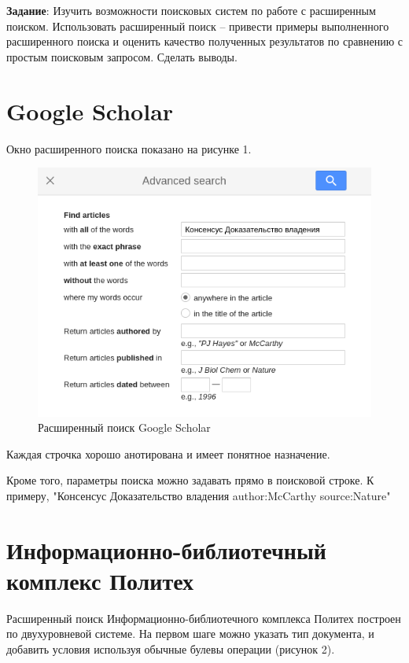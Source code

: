 \documentclass[a4paper, 12pt]{report}		%
\begin{document}
\textbf{Задание}: Изучить возможности поисковых систем по работе с расширенным поиском. Использовать расширенный поиск – привести примеры выполненного расширенного поиска и оценить качество полученных результатов по сравнению с простым поисковым запросом. Сделать выводы.

\section*{Google Scholar}

Окно расширенного поиска показано на рисунке 1.

\begin{figure}[H]
 \centering
 \includegraphics[scale=0.8]{res/src1}
 \caption{Расширенный поиск Google Scholar}
\end{figure}

Каждая строчка хорошо анотирована и имеет понятное назначение.

Кроме того, параметры поиска можно задавать прямо в поисковой строке. К примеру, "Консенсус Доказательство владения author:McCarthy source:Nature"

\section*{Информационно-библиотечный комплекс Политех}

Расширенный поиск Информационно-библиотечного комплекса Политех построен по двухуровневой системе. На первом шаге можно указать тип документа, и добавить условия используя обычные булевы операции (рисунок 2).
\end{document}
